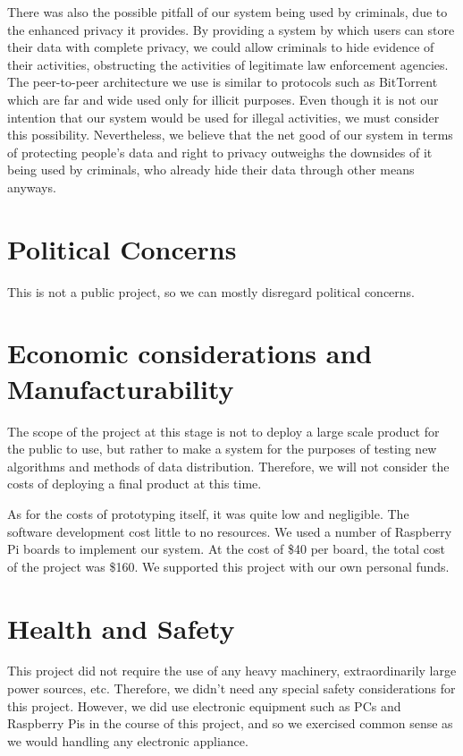 	There was also the possible pitfall of our system being used by criminals, due to the enhanced privacy it provides.  By providing a system by which users can store their data with complete privacy, we could allow criminals to hide evidence of their activities, obstructing the activities of legitimate law enforcement agencies. The peer-to-peer architecture we use is similar to protocols such as BitTorrent which are far and wide used only for illicit purposes.  Even though it is not our intention that our system would be used for illegal activities, we must consider this possibility.  Nevertheless, we believe that the net good of our system in terms of protecting people's data and right to privacy outweighs the downsides of it being used by criminals, who already hide their data through other means anyways.

\section{Political Concerns}
	This is not a public project, so we can mostly disregard political concerns.

\section{Economic considerations and Manufacturability}
	The scope of the project at this stage is not to deploy a large scale product for the public to use, but rather to make a system for the purposes of testing new algorithms and methods of data distribution.  Therefore, we will not consider the costs of deploying a final product at this time.

	As for the costs of prototyping itself, it was quite low and negligible.  The software development cost little to no resources.  We used a number of Raspberry Pi boards to implement our system.  At the cost of \$40 per board, the total cost of the project was \$160.  We supported this project with our own personal funds.

\section{Health and Safety}
	This project did not require the use of any heavy machinery, extraordinarily large power sources, etc.  Therefore, we didn't need any special safety considerations for this project.  However, we did use electronic equipment such as PCs and Raspberry Pis in the course of this project, and so we exercised common sense as we would handling any electronic appliance.

